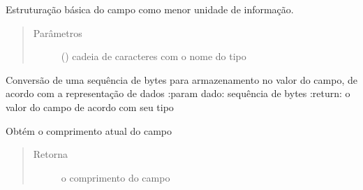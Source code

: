 \documentclass[letterpaper,10pt,brazil]{sphinxmanual}
\begin{document}
\begin{fulllineitems}
\label{\detokenize{index:estrutarq.campo.campo_comum.CampoBasico}}
\pysigstartsignatures
{}
\pysigstopsignatures
\sphinxAtStartPar
Estruturação básica do campo como menor unidade de informação.
\begin{quote}\begin{description}
\item[{Parâmetros}] \leavevmode
\sphinxAtStartPar
{} () \textendash{} cadeia de caracteres com o nome do tipo

\end{description}\end{quote}

\begin{fulllineitems}
\label{\detokenize{index:estrutarq.campo.campo_comum.CampoBasico.bytes_para_valor}}
\pysigstartsignatures
{}
\pysigstopsignatures
\sphinxAtStartPar
Conversão de uma sequência de bytes para armazenamento no valor
do campo, de acordo com a representação de dados
:param dado: sequência de bytes
:return: o valor do campo de acordo com seu tipo

\end{fulllineitems}


\begin{fulllineitems}
\label{\detokenize{index:estrutarq.campo.campo_comum.CampoBasico.comprimento}}
\pysigstartsignatures
{}
\pysigstopsignatures
\sphinxAtStartPar
Obtém o comprimento atual do campo
\begin{quote}\begin{description}
\item[{Retorna}] \leavevmode
\sphinxAtStartPar
o comprimento do campo


\end{description}
\end{quote}
\end{fulllineitems}
\end{fulllineitems}
\end{document}
